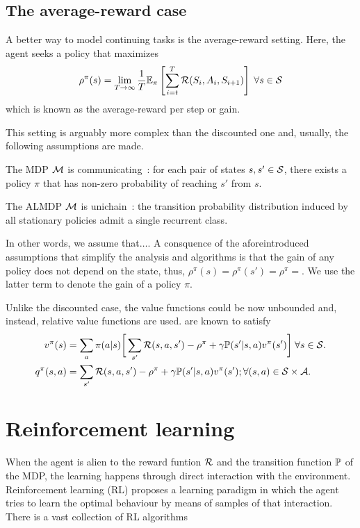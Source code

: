 \subsection{The average-reward case}
A better way to model continuing tasks is the average-reward setting. Here, the agent seeks a policy that maximizes 
\begin{equation}
  \rho^\pi(s) =\lim_{T\rightarrow\infty}\frac 1 T \mathbb{E}_\pi\left[\sum_{i=t}^T\mathcal{R}(S_i, A_i, S_{i+1})\right] \;\forall s\in\mathcal{S}
\end{equation}
which is known as the average-reward per step or gain.

This setting is arguably more complex than the discounted one and, usually, the following assumptions are made.

\begin{assumption}
  The MDP $\mathcal{M}$ is communicating~\citep{Puterman1994}: for each pair of states $s,s'\in\mathcal{S}$, there exists a policy $\pi$ that has non-zero probability of reaching $s'$ from $s$.
  \label{ass:mdp_communicating}
\end{assumption}

\begin{assumption}
  The ALMDP $\mathcal{M}$ is unichain~\citep{Puterman1994}: the transition probability distribution induced by all stationary policies admit a single recurrent class.
  \label{ass:mdp_unichain}
\end{assumption}

In other words, we assume that$\dots$. A consquence of the aforeintroduced assumptions that simplify the analysis and algorithms is that the gain of any policy does not depend on the state, thus, $\rho^\pi(s) = \rho^\pi(s') = \rho^\pi = $. We use the latter term to denote the gain of a policy $\pi$.

Unlike the discounted case, the value functions could be now unbounded and, instead, relative value functions are used. are known to satisfy
\begin{align}
  v^\pi(s) &= \sum_a \pi(a\lvert s)\bigg[\sum_{s'} \mathcal{R}(s, a, s') - \rho^\pi + \gamma \mathbb{P}(s'\lvert s, a)v^\pi(s')\bigg]\;\forall s\in\mathcal{S}. \\
  q^\pi(s, a) &= \sum_{s'} \mathcal{R}(s, a, s') - \rho^\pi + \gamma \mathbb{P}(s'\lvert s, a)v^\pi(s');\forall (s,a)\in\mathcal{S}\times\mathcal{A}. 
\end{align}

\section{Reinforcement learning}
When the agent is alien to the reward funtion $\mathcal{R}$ and the transition function $\mathbb{P}$ of the MDP, the learning happens through direct interaction with the environment. Reinforcement learning (RL) proposes a learning paradigm in which the agent tries to learn the optimal behaviour by means of samples of that interaction. There is a vast collection of RL algorithms


